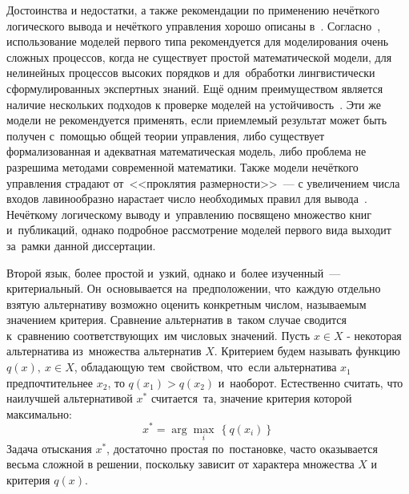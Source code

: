 \begin{figure}[h!]
\end{figure}

Достоинства и недостатки, а также рекомендации по применению нечёткого логического вывода и нечёткого управления хорошо описаны в~\cite{Bauer_Winkler, Grinyaev_Computerra}. Согласно~\cite{Bauer_Winkler, Pavlov_Sokolov}, использование моделей первого типа рекомендуется для моделирования очень сложных процессов, когда не существует простой математической модели, для нелинейных процессов высоких порядков и для~обработки лингвистически сформулированных экспертных знаний. Ещё одним преимуществом является наличие нескольких подходов к проверке моделей на устойчивость~\cite{Pegat, Uskov_Kruglov}. Эти же модели не рекомендуется применять, если приемлемый результат может быть получен с~помощью общей теории управления, либо существует формализованная и адекватная математическая модель, либо проблема не разрешима методами современной математики. Также модели нечёткого управления страдают от~<<проклятия размерности>>~--- с увеличением числа входов лавинообразно нарастает число необходимых правил для вывода~\cite{Pegat, Fuller}. Нечёткому логическому выводу и~управлению посвящено множество книг и~публикаций, однако подробное рассмотрение моделей первого вида выходит за~рамки данной диссертации.

Второй язык, более простой и~узкий, однако и~более изученный~--- критериальный. Он~основывается на~предположении, что~каждую отдельно взятую альтернативу возможно оценить конкретным числом, называемым значением критерия. Сравнение альтернатив в~таком случае сводится к~сравнению соответствующих~им числовых значений. Пусть $x\in X$ - некоторая альтернатива из~множества альтернатив $X$. Критерием будем называть функцию $q\left( x \right),\ x\in X$, обладающую тем~свойством, что~если альтернатива ${x_1}$ предпочтительнее ${x_2}$, то $q\left( x_1 \right)>q\left( x_2 \right)$ и~наоборот. Естественно считать, что наилучшей альтернативой ${{x}^{*}}$ считается~та, значение критерия которой максимально:
\begin{equation*}
  x^{*}=\arg \underset{i}{\mathop{\max }}\,\left\{ q\left( x_i \right) \right\}
\end{equation*}
Задача отыскания $x^{*}$, достаточно простая по~постановке, часто оказывается весьма сложной в решении, поскольку зависит от характера множества $X$ и критерия $q\left( x \right)$. 

